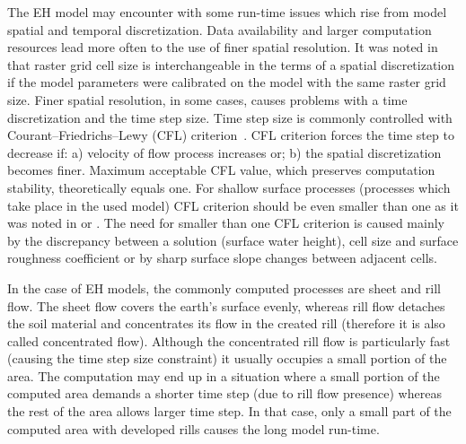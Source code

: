The EH model may encounter with some run-time issues which 
rise from model spatial and temporal discretization. 
Data availability and larger computation resources lead more often 
to the use of finer spatial resolution. 
It was noted in \cite{molnar2000} that raster grid cell size is interchangeable 
in the terms of a spatial discretization if the model parameters 
were calibrated on the model with the same raster grid size. 
Finer spatial resolution, in some 
cases, causes problems with a time discretization and the time step size. 
Time step size is commonly 
controlled with Courant--Friedrichs--Lewy (CFL) criterion~\cite{courant1928}. 
CFL criterion forces the time step to decrease if: a) velocity of flow 
process increases or; b) the spatial discretization becomes finer. 
Maximum acceptable CFL value, which preserves computation stability, theoretically equals one. 
For shallow surface processes (processes which take place in the used model)
CFL criterion should 
be even smaller than one as it was noted in \cite{zhang1989}
or \cite{esteves2000}. The need for smaller than one CFL criterion 
is caused mainly by the discrepancy between a solution (surface water height), 
cell size and surface roughness coefficient 
or by sharp surface slope changes between adjacent cells. 

In the case of EH models, the commonly computed processes are sheet 
and 
rill flow. 
The sheet flow covers the earth's surface evenly, whereas rill flow detaches 
the soil material and concentrates its flow in the created rill 
(therefore it is also called concentrated flow).
Although the concentrated rill flow is particularly fast (causing  
the time step size constraint) it usually occupies a small portion of the area. 
The computation may end up in a situation where a 
small portion of the computed area demands a shorter time step 
(due to rill flow presence) whereas the rest of the area allows larger time step. 
In that case, only a small part of the computed area with developed rills causes the long model run-time. 

